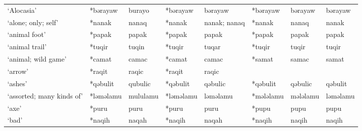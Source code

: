 \begin{landscape}
\begin{longtable}[c]{@{}p{3cm}<{\raggedright}p{2.75cm}<{\raggedright}p{2.75cm}<{\raggedright}p{2.75cm}<{\raggedright}p{2.75cm}<{\raggedright}p{2.75cm}<{\raggedright}p{2.75cm}<{\raggedright}p{2.75cm}<{\raggedright}@{}}
`Alocasia'                                           & *bərayaw           & burayo                         & *bərayaw           & bərayaw                    & *bərayaw         & bərayaw                  & bərayaw                           \\
`alone; only; self'                                  & *nanak             & nanaq                          & *nanak             & nanak; nanaq               & *nanak           & nanaq                    & nanak                             \\
`animal foot'                                        & *papak             & papak                          & *papak             & papak                      & *papak           & papak                    & papak                             \\
`animal trail'                                       & *tuqir             & tuqin                          & *tuqir             & tuqar                      & *tuqir           & tuqir                    & tuqir                             \\
`animal; wild game'                                  & *camat             & camac                          & *camat             & camac                      & *samat           & samac                    & samat                             \\
`arrow'                                              & *raqit             & raqic                          & *raqit             & raqic                      &                  &                          &                                   \\
`ashes'                                              & *qəbulit           & qubulic                        & *qəbulit           & qəbulic                    & *qəbulit         & qəbulic                  & qəbulit                           \\
`assorted; many kinds of'                            & *ləməlamu          & mululamu                       & *ləməlamu          & ləməlamu                   & *mələlamu        & mələlamu                 & ləməlamu                          \\
`axe'                                                & *puru              & puru                           & *puru              & puru                       & *pupu            & pupu                     & pupu                              \\
`bad'                                                & *naqih             & naqah                          & *naqih             & naqah                      & *naqih           & naqih                    & naqih                             \\

\end{longtable}
\end{landscape}
